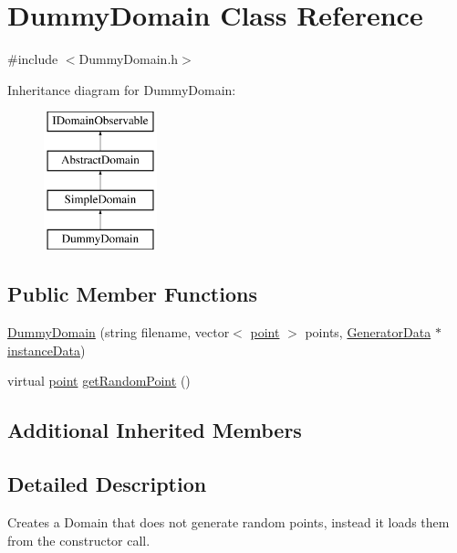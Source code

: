 \hypertarget{class_dummy_domain}{}\section{Dummy\+Domain Class Reference}
\label{class_dummy_domain}


{\ttfamily \#include $<$Dummy\+Domain.\+h$>$}

Inheritance diagram for Dummy\+Domain\+:\begin{figure}[H]
\begin{center}
\leavevmode
\includegraphics[height=4.000000cm]{d6/d87/class_dummy_domain}
\end{center}
\end{figure}
\subsection*{Public Member Functions}
\begin{DoxyCompactItemize}
\item 
\hyperlink{class_dummy_domain_a6c325be924e6f60c83bec4ec6ac495e3}{Dummy\+Domain} (string filename, vector$<$ \hyperlink{structpoint}{point} $>$ points, \hyperlink{class_generator_data}{Generator\+Data} $\ast$\hyperlink{class_abstract_domain_aa37fbabc2bfa92c574f7db7544016b53}{instance\+Data})
\item 
virtual \hyperlink{structpoint}{point} \hyperlink{class_dummy_domain_a72074e5e3e53028ec4b73bffee1ba229}{get\+Random\+Point} ()
\end{DoxyCompactItemize}
\subsection*{Additional Inherited Members}


\subsection{Detailed Description}
Creates a Domain that does not generate random points, instead it loads them from the constructor call. 

